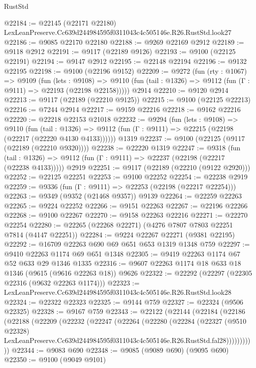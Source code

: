 \begin{lexlean}{RustStd}
\begin{coremodule}
@22184 := @22145
    (@22171 @22180)
    LexLeanPreserve.Cc639d244984595f0311043c4c505146e.R26.RustStd.look27
@22186 := @9085 @22170 @22180
@22188 := @9269 @22169 @2912
@22189 := @9118 @2912
@22191 := @9117 (@22189 @9126)
@22193 := @9100 (@22125 @22191)
@22194 := @9147 @2912
@22195 := @22148 @22194
@22196 := @9132 @22195
@22198 := @9100 (@22196 @9152)
@22209 := @9272
    (fun (rty : @1067) =>
    @9109
      (fun (lets : @9108) =>
      @9110 (fun (tail : @1326) => @9112 (fun (Γ : @9111) => @22193 (@22198 @22158)))))
    @2914
@22210 := @9120 @2914
@22213 := @9117 (@22189 (@22210 @9125))
@22215 := @9100 (@22125 @22213)
@22216 := @7244 @2914
@22217 := @9159 @22216
@22218 := @9162 @22216
@22220 := @22218 @22153 @21018
@22232 := @9294
    (fun (lets : @9108) =>
    @9110
      (fun (tail : @1326) =>
      @9112 (fun (Γ : @9111) => @22215 (@22198 (@22217 (@22220 @4130 @4133))))))
    @1319
@22237 := @9100 (@22125 (@9117 (@22189 (@22210 @9320))))
@22238 := @22220 @1319
@22247 := @9318
    (fun (tail : @1326) => @9112 (fun (Γ : @9111) => @22237 (@22198 (@22217 (@22238 @4133)))))
    @2919
@22251 := @9117 (@22189 (@22210 (@9122 @2920)))
@22252 := @22125 @22251
@22253 := @9100 @22252
@22254 := @22238 @2919
@22259 := @9336 (fun (Γ : @9111) => @22253 (@22198 (@22217 @22254)))
@22263 := @9349 (@9352 (@21468 @9357)) @9139
@22264 := @22259 @22263
@22265 := @9224 @22252
@22266 := @9151 @22263
@22267 := @22196 @22266
@22268 := @9100 @22267
@22270 := @9158 @22263 @22216
@22271 := @22270 @22254
@22280 := @22265 (@22268 @22271) (@4276 @7807 @7803 @22251 @7814 (@4147 @22251))
@22284 := @9224 @22267 @22271 (@9381 @22195)
@22292 := @16709 @22263 @690 @69 @651 @653 @1319 @1348 @759
@22297 := @9410 @22263 @1174 @69 @651 @1348
@22305 := @9419 @22263 @1174 @67 @52 @633 @29 @1346 @1335
@22316 := @9607 @22263 @1174 @18 @633 @18 @1346 (@9615 (@9616 @22263 @18)) @9626
@22322 := @22292 (@22297 (@22305 @22316 (@9632 @22263 @1174)))
@22323 := LexLeanPreserve.Cc639d244984595f0311043c4c505146e.R26.RustStd.look28
@22324 := @22322 @22323
@22325 := @9144 @759
@22327 := @22324 (@9506 @22325)
@22328 := @9167 @759
@22343 := @22122
    (@22144
      (@22184
        (@22186
          (@22188
            (@22209
              (@22232
                (@22247
                  (@22264
                    (@22280
                      (@22284
                        (@22327
                          (@9510 @22328)
                          LexLeanPreserve.Cc639d244984595f0311043c4c505146e.R26.RustStd.fal28)))))))))))
@22344 := @9083 @690
@22348 := @9085 (@9089 @690) (@9095 @690)
@22350 := @9100 (@9049 @9101)

\end{coremodule}
\end{lexlean}
